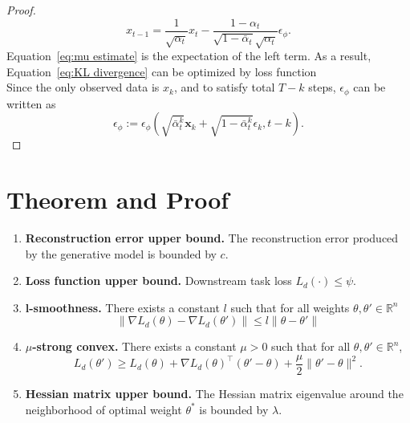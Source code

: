 \begin{proof}
$$
x_{t-1}=\frac{1}{\sqrt{\alpha_t}}x_t - \frac{1 - \alpha_t}{\sqrt{1 - \bar{\alpha}_t} \sqrt{\alpha_t}}\epsilon_{\phi}.
$$
Equation~\ref{eq:mu estimate} is the expectation of the left term. As a result, Equation~\ref{eq:KL divergence} can be optimized by loss function\\
Since the only observed data is $x_k$, and to satisfy total $T-k$ steps, $\epsilon_{\phi}$ can be written as
$$
    \epsilon_{\phi} := \epsilon_{\phi}(\sqrt{\bar{\alpha}^k_t} \mathbf{x}_k + \sqrt{1 - \bar{\alpha}^k_t}\epsilon_k, t-k).
$$
\end{proof}


\clearpage
\section{Theorem and Proof}\label{sec:appendix_2}
\begin{assumption}\label{assumption}
\noindent
\begin{enumerate}
    \item \textbf{Reconstruction error upper bound.}
    The reconstruction error produced by the generative model is bounded by $c$.
    \item \textbf{Loss function upper bound.}
    Downstream task loss $L_d(\cdot) \leq \psi$.
    \item \textbf{l-smoothness.}
    There exists a constant $l$ such that for all weights \( \theta, \theta' \in \mathbb{R}^n \)
    \[
    \|\nabla L_d(\theta) - \nabla L_d(\theta')\| \leq l \|\theta - \theta'\|
    \]
    \item \textbf{$\mu$-strong convex.}
    There exists a constant \( \mu > 0 \) such that for all \( \theta,\theta' \in \mathbb{R}^n \),
    \[
    L_d(\theta') \geq L_d(\theta) + \nabla L_d(\theta)^\top (\theta' - \theta) + \frac{\mu}{2} \| \theta' - \theta \|^2.
    \]
    \item \textbf{Hessian matrix upper bound.}
    The Hessian matrix eigenvalue around the neighborhood of optimal weight $\theta^*$ is bounded by $\lambda$.
\end{enumerate}
\end{assumption}

